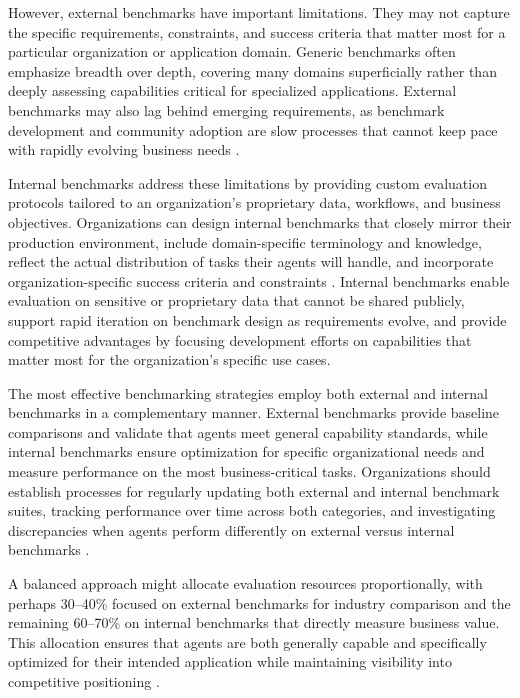 \begin{TNtwocol}
However, external benchmarks have important limitations. They may not capture the specific requirements, constraints, and success criteria that matter most for a particular organization or application domain. Generic benchmarks often emphasize breadth over depth, covering many domains superficially rather than deeply assessing capabilities critical for specialized applications. External benchmarks may also lag behind emerging requirements, as benchmark development and community adoption are slow processes that cannot keep pace with rapidly evolving business needs \cite{arize2024,googlecloud2024}.

Internal benchmarks address these limitations by providing custom evaluation protocols tailored to an organization's proprietary data, workflows, and business objectives. Organizations can design internal benchmarks that closely mirror their production environment, include domain-specific terminology and knowledge, reflect the actual distribution of tasks their agents will handle, and incorporate organization-specific success criteria and constraints \cite{arize2024,googlecloud2024,aws2024}. Internal benchmarks enable evaluation on sensitive or proprietary data that cannot be shared publicly, support rapid iteration on benchmark design as requirements evolve, and provide competitive advantages by focusing development efforts on capabilities that matter most for the organization's specific use cases.

The most effective benchmarking strategies employ both external and internal benchmarks in a complementary manner. External benchmarks provide baseline comparisons and validate that agents meet general capability standards, while internal benchmarks ensure optimization for specific organizational needs and measure performance on the most business-critical tasks. Organizations should establish processes for regularly updating both external and internal benchmark suites, tracking performance over time across both categories, and investigating discrepancies when agents perform differently on external versus internal benchmarks \cite{ibm2024,liu2023,liang2023}.

A balanced approach might allocate evaluation resources proportionally, with perhaps 30–40\% focused on external benchmarks for industry comparison and the remaining 60–70\% on internal benchmarks that directly measure business value. This allocation ensures that agents are both generally capable and specifically optimized for their intended application while maintaining visibility into competitive positioning \cite{ibm2024,liu2023,liang2023}.


\end{TNtwocol}
